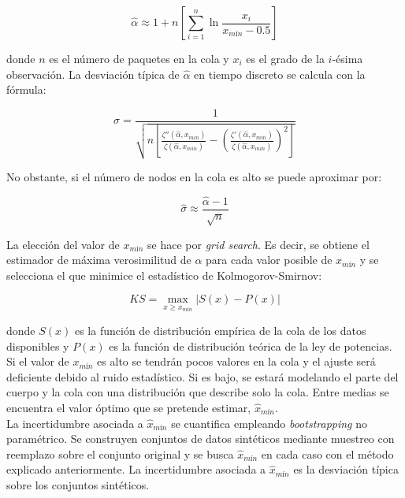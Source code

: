 \documentclass[12pt,a4paper]{report}
\begin{document}
	\begin{equation}
	\hat{\alpha} \approx 1 + n \left[\sum_{i=1}^n \ln \frac{x_i}{x_{mín} - 0.5}\right]
	\end{equation}
	
	donde $n$ es el número de paquetes en la cola y $x_i$ es el grado de la $i$-ésima observación. La desviación típica de $\hat{\alpha}$ en tiempo discreto se calcula con la fórmula:
	
	\begin{equation}
	\sigma = \frac{1}{\sqrt{n \left[ \frac{\zeta''(\hat{\alpha}, x_{min})}{\zeta(\hat{\alpha}, x_{min})} - \left( \frac{\zeta'(\hat{\alpha}, x_{min})}{\zeta(\hat{\alpha}, x_{min})} \right)^2 \right]}}
	\end{equation}
	
	No obstante, si el número de nodos en la cola es alto se puede aproximar por:
	
	\begin{equation}
	\hat{\sigma} \approx \frac{\hat{\alpha} - 1}{\sqrt{n}}
	\end{equation}
	
	La elección del valor de $x_{mín}$ se hace por \textit{grid search}. Es decir, se obtiene el estimador de máxima verosimilitud de $\alpha$ para cada valor posible de $x_{mín}$ y se selecciona el que minimice el estadístico de Kolmogorov-Smirnov:
	
	\begin{equation}
	KS = \max_{x \ge x_{mín}} |S(x) - P(x)|
	\end{equation} 
	
	donde $S(x)$ es la función de distribución empírica de la cola de los datos disponibles y $P(x)$ es la función de distribución teórica de la ley de potencias. Si el valor de $x_{mín}$ es alto se tendrán pocos valores en la cola y el ajuste será deficiente debido al ruido estadístico. Si es bajo, se estará modelando el parte del cuerpo y la cola con una distribución que describe solo la cola. Entre medias se encuentra el valor óptimo que se pretende estimar, $\hat{x}_{mín}$. \\
	
	La incertidumbre asociada a $\hat{x}_{mín}$ se cuantifica empleando \textit{bootstrapping} no paramétrico. Se construyen conjuntos de datos sintéticos mediante muestreo con reemplazo sobre el conjunto original y se busca $\hat{x}_{mín}$ en cada caso con el método explicado anteriormente. La incertidumbre asociada a $\hat{x}_{mín}$ es la desviación típica sobre los conjuntos sintéticos. 
	
\end{document}

